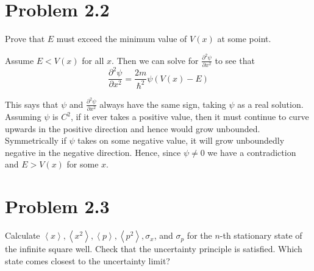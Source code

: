\documentclass{article}
\newcommand{\dddx}[1]{\frac{\partial^2 #1}{\partial x^2}}
\newcommand{\paren}[1]{\left( #1 \right)}
\newcommand{\braket}[1]{\left\langle #1 \right\rangle}
\begin{document}
\section*{Problem 2.2}
  Prove that $E$ must exceed the minimum value of $V(x)$ at some point. 

  \noindent Assume $E < V(x)$ for all $x$. Then we can solve for $\dddx{\psi}$ to see that
  $$ \dddx{\psi} = \frac{2m}{\hbar^2} \psi \paren{V(x) - E} $$

  This says that $\psi$ and $\dddx{\psi}$ always have the same sign, taking $\psi$ as a real solution.
  Assuming $\psi$ is $C^2$, if it ever takes a positive value, then it must continue to curve upwards in the positive direction and hence would grow unbounded.
  Symmetrically if $\psi$ takes on some negative value, it will grow unboundedly negative in the negative direction. 
  Hence, since $\psi \neq 0$ we have a contradiction and $E > V(x)$ for some $x$.

\section*{Problem 2.3}
Calculate $\braket{x}, \braket{x^2}, \braket{p}, \braket{p^2}, \sigma_x$, and $\sigma_p$ for the $n$-th stationary state of the infinite square well.
Check that the uncertainty principle is satisfied.
Which state comes closest to the uncertainty limit?
\end{document}

